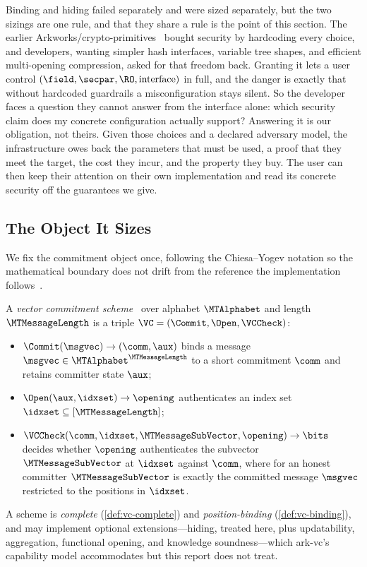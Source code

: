\label{sec:spine}

Binding and hiding failed separately and were sized separately, but the two
sizings are one rule, and that they share a rule is the point of this section.
The earlier \textsf{Arkworks/crypto-primitives}~\cite{ArkCryptoPrimitives} bought security by hardcoding every
choice, and developers, wanting simpler hash interfaces, variable tree shapes,
and efficient multi-opening compression, asked for that freedom back.  Granting
it lets a user control $(\field,\secpar,\RO,\text{interface})$ in full, and the
danger is exactly that without hardcoded guardrails a misconfiguration stays
silent.  So the developer faces a question they cannot answer from the interface
alone: which security claim does my concrete configuration actually support?
Answering it is our obligation, not theirs.  Given those choices and a
declared adversary model, the
infrastructure owes back the parameters that must be used, a proof that they
meet the target, the cost they incur, and the property they buy.  The user can
then keep their attention on their own implementation and read its concrete
security off the guarantees we give.

\subsection{The Object It Sizes}
\label{sec:object}

We fix the commitment object once, following the Chiesa--Yogev notation so the
mathematical boundary does not drift from the reference the implementation
follows~\cite{CY26}.

\begin{definition}\label{def:vcgeneral}
A \emph{vector commitment scheme}~\cite{CF13} over alphabet $\MTAlphabet$ and length
$\MTMessageLength$ is a triple $\VC=(\Commit,\Open,\VCCheck)$:
\begin{itemize}
  \item $\Commit(\msgvec)\to(\comm,\aux)$ binds a message
  $\msgvec\in\MTAlphabet^{\MTMessageLength}$ to a short commitment $\comm$ and
  retains committer state $\aux$;
  \item $\Open(\aux,\idxset)\to\opening$ authenticates an index set
  $\idxset\subseteq[\MTMessageLength]$;
  \item $\VCCheck(\comm,\idxset,\MTMessageSubVector,\opening)\to\bits$ decides
  whether $\opening$ authenticates the subvector $\MTMessageSubVector$ at
  $\idxset$ against $\comm$, where for an honest committer
  $\MTMessageSubVector$ is exactly the committed message $\msgvec$ restricted
  to the positions in $\idxset$.
\end{itemize}
A scheme is \emph{complete} (\cref{def:vc-complete}) and
\emph{position-binding} (\cref{def:vc-binding}), and may implement optional
extensions---hiding, treated here, plus updatability, aggregation, functional
opening, and knowledge soundness---which \textsf{ark-vc}'s capability model
accommodates but this report does not treat.
\end{definition}

